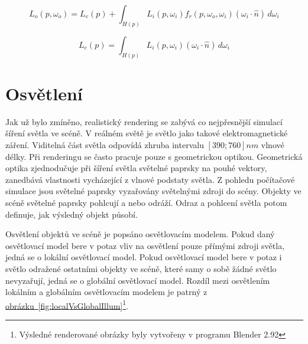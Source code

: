 \documentclass[czech,master]{diploma}
\newcommand{\interval}[1]{\left[{#1}\right]}
\newcommand{\uvec}[1]{\hat{#1}}
\newcommand{\point}{p}
\newcommand{\brdf}{f_r\left(\point,\omega_{o},\omega_{i}\right)}
\newcommand{\normVec}{\uvec{n}}
\newcommand{\inVec}{\omega_{i}}
\newcommand{\outVec}{\omega_{o}}
\newcommand{\outRadiance}{L_o\left(\point,\outVec\right)}
\newcommand{\inRadiance}{L_i\left(\point,\inVec\right)}
\newcommand{\emitRadiance}{L_e\left(\point\right)}
\newcommand{\inDotNorm}{\left(\inVec\cdot\normVec\right)}
\begin{document}
\begin{equation} \label{eq:render}
  \outRadiance = \emitRadiance + \int_{H \left( \point \right)}^{~}\inRadiance \brdf \inDotNorm \,d\inVec
\end{equation}

\begin{equation} \label{eq:renderIrradiance}
  \emitRadiance = \int_{H \left( \point \right)}^{~}\inRadiance \inDotNorm \,d\inVec
\end{equation}

\section{Osvětlení}
Jak už bylo zmíněno, realistický rendering se zabývá co nejpřesnější simulací šíření světla ve scéně. V reálném světě je světlo jako takové elektromagnetické záření. Viditelná část světla odpovídá zhruba intervalu \(\interval{390;760}nm\) vlnové délky. Při renderingu se často pracuje pouze s geometrickou optikou. Geometrická optika zjednodučuje při šíření světla světelné paprsky na pouhé vektory, zanedbává vlastnosti vycházející z vlnové podstaty světla. Z pohledu počítačové simulace jsou světelné paprsky vyzařovány světelnými zdroji do scény. Objekty ve scéně světelné paprsky pohlcují a nebo odráží. Odraz a pohlcení světla potom definuje, jak výsledný objekt působí. \par
Osvětlení objektů ve scéně je popsáno osvětlovacím modelem. Pokud daný osvětlovací model bere v potaz vliv na osvětlení pouze přímými zdroji světla, jedná se o lokální osvětlovací model. Pokud osvětlovací model bere v potaz i světlo odražené ostatními objekty ve scéně, které samy o sobě žádné světlo nevyzařují, jedná se o globální osvětlovací model. Rozdíl mezi osvětlením lokálním a globálním osvětlovacím modelem je patrný z \hyperref[fig:localVsGlobalIllum]{obrázku~\ref{fig:localVsGlobalIllum}}\footnote{Výsledné renderované obrázky byly vytvořeny v programu Blender 2.92}.
\end{document}

